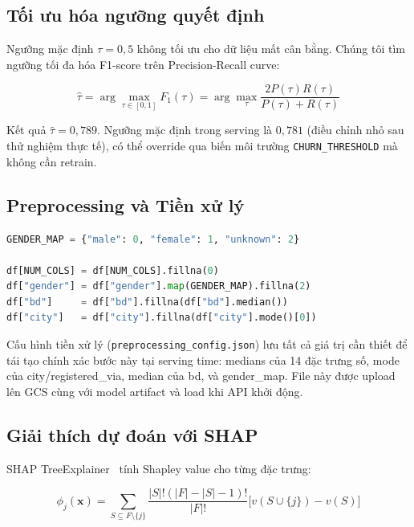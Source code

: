 \documentclass[conference]{IEEEtran}
\begin{document}
\subsection{Tối ưu hóa ngưỡng quyết định}

Ngưỡng mặc định $\tau = 0{,}5$ không tối ưu cho dữ liệu mất cân bằng. Chúng
tôi tìm ngưỡng tối đa hóa F1-score trên Precision-Recall curve:

\begin{equation}
  \hat{\tau} = \arg\max_{\tau \in [0,1]}
  F_1(\tau) = \arg\max_{\tau}
  \frac{2 P(\tau) R(\tau)}{P(\tau) + R(\tau)}
\end{equation}

Kết quả $\hat{\tau} = 0{,}789$. Ngưỡng mặc định trong serving là $0{,}781$
(điều chỉnh nhỏ sau thử nghiệm thực tế), có thể override qua biến môi trường
\texttt{CHURN\_THRESHOLD} mà không cần retrain.

\subsection{Preprocessing và Tiền xử lý}

\begin{lstlisting}[language=Python, caption={Tiền xử lý trong training}]
GENDER_MAP = {"male": 0, "female": 1, "unknown": 2}

df[NUM_COLS] = df[NUM_COLS].fillna(0)
df["gender"] = df["gender"].map(GENDER_MAP).fillna(2)
df["bd"]     = df["bd"].fillna(df["bd"].median())
df["city"]   = df["city"].fillna(df["city"].mode()[0])
\end{lstlisting}

Cấu hình tiền xử lý (\texttt{preprocessing\_config.json}) lưu tất cả giá
trị cần thiết để tái tạo chính xác bước này tại serving time: medians của
14 đặc trưng số, mode của city/registered\_via, median của bd, và
gender\_map. File này được upload lên GCS cùng với model artifact và load
khi API khởi động.

\subsection{Giải thích dự đoán với SHAP}

SHAP TreeExplainer~\cite{lundberg2017unified} tính Shapley value cho từng
đặc trưng:

\begin{equation}
  \phi_j(\mathbf{x}) = \sum_{S \subseteq F \setminus \{j\}}
  \frac{|S|!(|F|-|S|-1)!}{|F|!}
  \big[v(S \cup \{j\}) - v(S)\big]
\end{equation}
\end{document}
